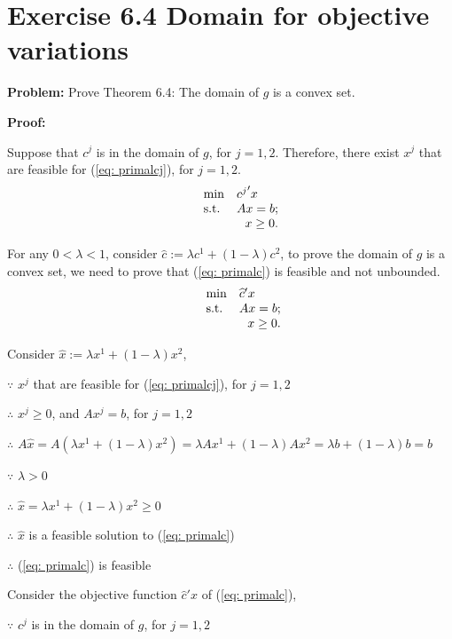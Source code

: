 \section{Exercise 6.4 Domain for objective variations}
\textbf{Problem:} Prove Theorem 6.4: The domain of $g$ is a convex set.

\textbf{Proof:} 

Suppose that $c^j$ is in the domain of $g$, for $j=1,2$. Therefore, there exist $x^j$ that are feasible for (\ref{eq: primalcj}), for $j=1,2$.
\begin{equation}
\label{eq: primalcj}
  \begin{array}{lrcll}
    \min
    & \multicolumn{4}{l}{{c^j}'x} \\
    \text{s.t.}
    & Ax=b;\\
    & x\geq0.
  \end{array}
\end{equation}

For any $0<\lambda<1$, consider $\widehat{c}:=\lambda{}c^1+(1-\lambda)c^2$, to prove the domain of $g$ is a convex set, we need to prove that (\ref{eq: primalc}) is feasible and not unbounded.  
\begin{equation}
\label{eq: primalc}
  \begin{array}{lrcll}
    \min
    & \multicolumn{4}{l}{\widehat{c}'x} \\
    \text{s.t.}
    & Ax=b;\\
    & x\geq0.
  \end{array}
\end{equation}

Consider $\widehat{x}:=\lambda{}x^1+(1-\lambda)x^2$, 

$\because$ $x^j$ that are feasible for (\ref{eq: primalcj}), for $j=1,2$

$\therefore$ $x^j\geq0$, and $Ax^j=b$, for $j=1,2$

$\therefore$ $A\widehat{x}=A(\lambda{}x^1+(1-\lambda)x^2)=\lambda{}Ax^1+(1-\lambda)Ax^2
=\lambda{}b+(1-\lambda)b=b$

$\because$ $\lambda>0$

$\therefore$ $\widehat{x}=\lambda{}x^1+(1-\lambda)x^2\geq0$

$\therefore$ $\widehat{x}$ is a feasible solution to (\ref{eq: primalc})

$\therefore$ (\ref{eq: primalc}) is feasible

Consider the objective function $\widehat{c}'x$ of (\ref{eq: primalc}),

$\because$ $c^j$ is in the domain of $g$, for $j=1,2$

